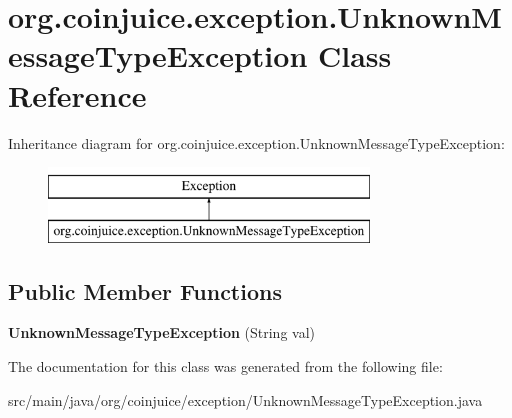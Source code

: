 \hypertarget{classorg_1_1coinjuice_1_1exception_1_1_unknown_message_type_exception}{\section{org.\-coinjuice.\-exception.\-Unknown\-Message\-Type\-Exception Class Reference}
\label{classorg_1_1coinjuice_1_1exception_1_1_unknown_message_type_exception}
}
Inheritance diagram for org.\-coinjuice.\-exception.\-Unknown\-Message\-Type\-Exception\-:\begin{figure}[H]
\begin{center}
\leavevmode
\includegraphics[height=2.000000cm]{classorg_1_1coinjuice_1_1exception_1_1_unknown_message_type_exception}
\end{center}
\end{figure}
\subsection*{Public Member Functions}
\begin{DoxyCompactItemize}
\item 
\hypertarget{classorg_1_1coinjuice_1_1exception_1_1_unknown_message_type_exception_ad39c7944a25ae56f7fd9d65b8dba569f}{{\bfseries Unknown\-Message\-Type\-Exception} (String val)}\label{classorg_1_1coinjuice_1_1exception_1_1_unknown_message_type_exception_ad39c7944a25ae56f7fd9d65b8dba569f}

\end{DoxyCompactItemize}


The documentation for this class was generated from the following file\-:\begin{DoxyCompactItemize}
\item 
src/main/java/org/coinjuice/exception/Unknown\-Message\-Type\-Exception.\-java\end{DoxyCompactItemize}
